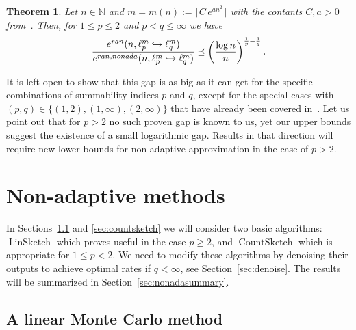 \documentclass[12pt]{article}
\theoremstyle{plain}
\newtheorem{theorem}{Theorem}[section]
\theoremstyle{definition}
\newcommand{\ran}{\textup{ran}}
\newcommand{\nonada}{\textup{nonada}}
\newcommand{\embed}{\hookrightarrow}
\newcommand{\N}{{\mathbb N}}
\DeclareMathOperator{\linsketch}{LinSketch}
\DeclareMathOperator{\countsketch}{CountSketch}
\begin{document}
\begin{theorem} \label{thm:adagap3}
    Let $n \in \N$ and $m = m(n) := \bigl\lceil C \, e^{an^2} \bigr\rceil$ with the contants $C,a > 0$ from~\cite[Thm~2.7]{KNW24}. Then, for $1 \leq p \leq 2$ and $p < q \leq \infty$ we have
    \begin{equation*}
        \frac{e^{\ran}(n,\ell_p^m \embed \ell_q^m)
            }{e^{\ran,\nonada}(n,\ell_p^m \embed \ell_q^m)}
                \preceq \left(\frac{\log n}{n}\right)^{\frac{1}{p} - \frac{1}{q}}.
    \end{equation*}
\end{theorem}

It is left open to show that this gap is as big as it can get for the specific combinations of summability indices $p$ and $q$, except for the special cases with $(p,q) \in \{(1,2), (1,\infty),(2,\infty)\}$ that have already been covered in~\cite{KNW24,KW24b}.
Let us point out that for $p > 2$ no such proven gap is known to us,
yet our upper bounds suggest the existence of a small logarithmic gap.
Results in that direction will require new lower bounds for non-adaptive approximation in the case of $p>2$.


\section{Non-adaptive methods}
\label{sec:nonada}

In Sections~\ref{sec:linsketch} and \ref{sec:countsketch} we will consider two basic algorithms: $\linsketch$ which proves useful in the case $p\geq 2$, and $\countsketch$ which is appropriate for \mbox{$1 \leq p < 2$}.
We need to modify these algorithms by denoising their outputs to achieve optimal rates if $q<\infty$, see Section~\ref{sec:denoise}. The results will be summarized in Section~\ref{sec:nonadasummary}.

\subsection{A linear Monte Carlo method}
\label{sec:linsketch}
\end{document}
